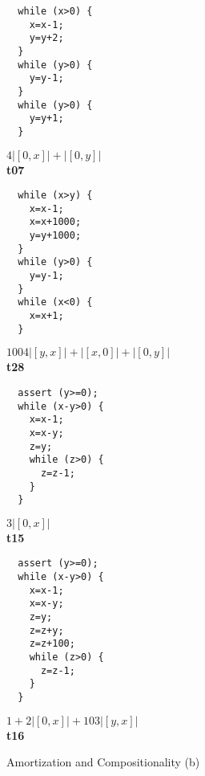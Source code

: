 \documentclass[nocopyrightspace,preprint]{sigplanconf}
\begin{document}
\begin{figure*}[t!]
 \setlength{\progwidth}{.24\linewidth}
  \centering

  \begin{minipage}[b]{\progwidth}
    \begin{center}
   \begin{lstlisting}
  while (x>0) {
    x=x-1;
    y=y+2;
  }
  while (y>0) {
    y=y-1;
  }
  while (y>0) {
    y=y+1;
  }
   \end{lstlisting}

$4|[0,x]| + |[0,y]|$
\\[.7\baselineskip]
      {\bf t07}
    \end{center}
  \end{minipage}%
%
%
%
  \begin{minipage}[b]{\progwidth}
    \begin{center}
   \begin{lstlisting}
  while (x>y) {
    x=x-1;
    x=x+1000;
    y=y+1000;
  }
  while (y>0) {
    y=y-1;
  }
  while (x<0) {
    x=x+1;
  }
   \end{lstlisting}

$1004|[y,x]|+|[x,0]|+|[0,y]|$
\\[.7\baselineskip]
      {\bf t28}
    \end{center}
  \end{minipage}%
%
%
  \begin{minipage}[b]{\progwidth}
    \begin{center}
   \begin{lstlisting}
  assert (y>=0);
  while (x-y>0) {
    x=x-1;
    x=x-y;
    z=y;
    while (z>0) {
      z=z-1;
    }
  }
   \end{lstlisting}

$3|[0,x]|$
\\[.7\baselineskip]
      {\bf t15}
    \end{center}
  \end{minipage}
%
%
  \begin{minipage}[b]{\progwidth}
    \begin{center}
   \begin{lstlisting}
  assert (y>=0);
  while (x-y>0) {
    x=x-1;
    x=x-y;
    z=y;
    z=z+y;
    z=z+100;
    while (z>0) {
      z=z-1;
    }
  }
   \end{lstlisting}

$1+2|[0,x]|+103|[y,x]|$
\\[.7\baselineskip]
      {\bf t16}
    \end{center}
  \end{minipage}


   \caption{Amortization and Compositionality (b)}
  \label{fig:cat1b}
\end{figure*}
\end{document}
